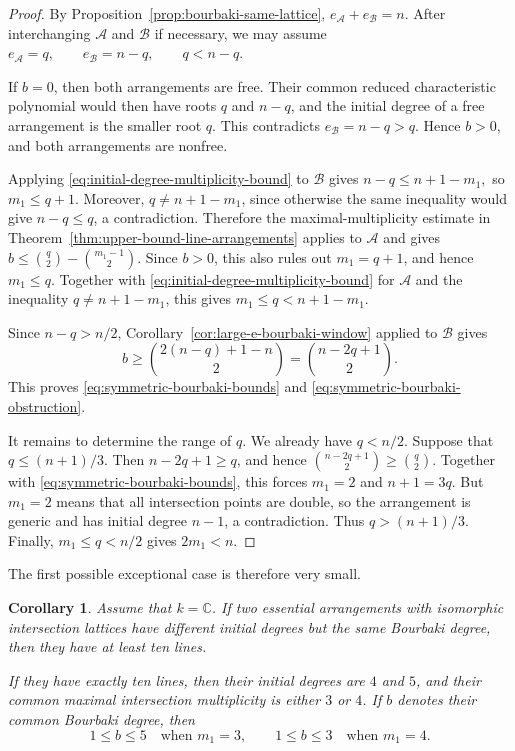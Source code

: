 \documentclass[11pt]{amsart}   %
\newtheorem{Corollary}[Theorem]{Corollary}
\theoremstyle{definition}
\def\NZQ{\mathbb}               %
\def\CC{{\NZQ C}}
\def\A{{\mathcal A}}
\def\B{{\mathcal B}}
\begin{document}
\begin{proof}
By Proposition~\ref{prop:bourbaki-same-lattice}, $e_\A+e_\B=n$. After interchanging $\A$ and $\B$ if necessary, we may assume $e_\A=q, \qquad e_\B=n-q, \qquad q<n-q.$

If $b=0$, then both arrangements are free. Their common reduced characteristic polynomial would then have roots $q$ and $n-q$, and the initial degree of a free arrangement is the smaller root $q$. This contradicts $e_\B=n-q>q$. Hence $b>0$, and both arrangements are nonfree.

Applying \eqref{eq:initial-degree-multiplicity-bound} to $\B$ gives $n-q\leq n+1-m_1,$ so $m_1\leq q+1$. Moreover, $q\neq n+1-m_1$, since otherwise the same inequality would give $n-q\leq q$, a contradiction. Therefore the maximal-multiplicity estimate in Theorem~\ref{thm:upper-bound-line-arrangements} applies to $\A$ and gives $b\leq \binom q2-\binom{m_1-1}{2}.$ Since $b>0$, this also rules out $m_1=q+1$, and hence $m_1\leq q$. Together with \eqref{eq:initial-degree-multiplicity-bound} for $\A$ and the inequality $q\neq n+1-m_1$, this gives $m_1\leq q<n+1-m_1.$

Since $n-q>n/2$, Corollary~\ref{cor:large-e-bourbaki-window} applied to $\B$ gives
\[
b\geq
\binom{2(n-q)+1-n}{2}
=
\binom{n-2q+1}{2}.
\]
This proves \eqref{eq:symmetric-bourbaki-bounds} and \eqref{eq:symmetric-bourbaki-obstruction}.

It remains to determine the range of $q$. We already have $q<n/2$. Suppose that $q\leq(n+1)/3$. Then $n-2q+1\geq q$, and hence $\binom{n-2q+1}{2}\geq\binom q2.$ Together with \eqref{eq:symmetric-bourbaki-bounds}, this forces $m_1=2$ and $n+1=3q$. But $m_1=2$ means that all intersection points are double, so the arrangement is generic and has initial degree $n-1$, a contradiction. Thus $q>(n+1)/3$. Finally, $m_1\leq q<n/2$ gives $2m_1<n$.
\end{proof}

The first possible exceptional case is therefore very small.

\begin{Corollary}
\label{cor:first-symmetric-bourbaki-case}
Assume that $k=\CC$. If two essential arrangements with isomorphic intersection lattices have different initial degrees but the same Bourbaki degree, then they have at least ten lines.

If they have exactly ten lines, then their initial degrees are $4$ and $5$, and their common maximal intersection multiplicity is either $3$ or $4$. If $b$ denotes their common Bourbaki degree, then
\[
1\leq b\leq5 \quad\text{when }m_1=3, \qquad 1\leq b\leq3 \quad\text{when }m_1=4.
\]
\end{Corollary}
\end{document}
